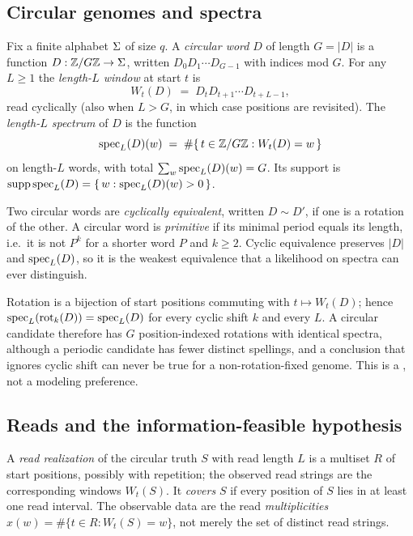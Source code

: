 \subsection{Circular genomes and spectra}

\begin{definition}
\label{def:spectrum}
Fix a finite alphabet $\Sigma$ of size $q$. A \emph{circular word} $D$ of
length $G=|D|$ is a function $D:\mathbb{Z}/G\mathbb{Z} \to \Sigma$, written
$D_0D_1\cdots D_{G-1}$ with indices mod $G$. For any $L\ge1$ the \emph{length-$L$
window} at start $t$ is
\[
  W_t(D) \;=\; D_t D_{t+1}\cdots D_{t+L-1},
\]
read cyclically (also when $L>G$, in which case positions are revisited).
The \emph{length-$L$ spectrum} of $D$ is the function
\[
  \operatorname{spec}_L(D)(w) \;=\; \#\{\, t \in \mathbb{Z}/G\mathbb{Z} : W_t(D)=w \,\}
\]
on length-$L$ words, with total $\sum_w \operatorname{spec}_L(D)(w) = G$. Its support is
$\operatorname{supp}\operatorname{spec}_L(D) = \{\,w : \operatorname{spec}_L(D)(w) > 0\,\}$.
\end{definition}

Two circular words are \emph{cyclically equivalent}, written $D \sim D'$, if one
is a rotation of the other. A circular word is \emph{primitive} if its minimal
period equals its length, i.e.\ it is not $P^k$ for a shorter word $P$ and
$k\ge 2$. Cyclic equivalence preserves $|D|$ and $\operatorname{spec}_L(D)$, so it is the
weakest equivalence that a likelihood on spectra can ever distinguish.

\begin{remark}
\label{rem:cyclic}
Rotation is a bijection of start positions commuting with $t \mapsto W_t(D)$;
hence $\operatorname{spec}_L(\operatorname{rot}_k(D))=\operatorname{spec}_L(D)$ for every cyclic shift $k$ and every $L$.
A circular candidate therefore has $G$ position-indexed rotations with
identical spectra, although a periodic candidate has fewer distinct spellings, and a conclusion that ignores cyclic shift can never be true for a
non-rotation-fixed genome. This is a \mathfact, not a modeling preference.
\end{remark}

\subsection{Reads and the information-feasible hypothesis}

\begin{definition}
\label{def:reads}
A \emph{read realization} of the circular truth $S$ with read length $L$ is a
multiset $R$ of start positions, possibly with repetition; the observed read
strings are the corresponding windows $W_t(S)$. It \emph{covers} $S$ if every
position of $S$ lies in at least one read interval. The observable data are the
read \emph{multiplicities} $x(w) = \#\{t \in R : W_t(S)=w\}$, not merely the set
of distinct read strings.
\end{definition}

